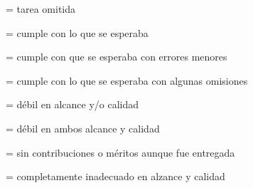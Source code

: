 \begin{description}[itemsep=-2pt]
\item[NP]{= tarea omitida}
\item[6]{= cumple con lo que se esperaba}
\item[5]{= cumple con que se esperaba con errores menores}
\item[4]{= cumple con lo que se esperaba con algunas omisiones}
\item[3]{= d\'{e}bil en alcance y/o calidad}
\item[2]{= d\'{e}bil en ambos alcance y calidad}
\item[1]{= sin contribuciones o m\'{e}ritos aunque fue entregada}
\item[0]{= completamente inadecuado en alzance y calidad}
\end{description}
  